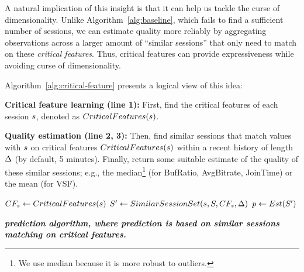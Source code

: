 A natural implication of this insight is that it can help us 
tackle  the curse of dimensionality.
Unlike Algorithm~\ref{alg:baseline}, which fails to find a 
sufficient number of sessions,
we can estimate quality more reliably by aggregating 
observations across a larger amount of ``similar sessions'' that 
only need to match on these {\em critical features}. 
Thus, critical features can provide expressiveness
while avoiding curse of dimensionality.

Algorithm~\ref{alg:critical-feature} presents a logical 
view of this idea:
\begin{packedenumerate}
\item {\bf Critical feature learning (line 1):} 
First, find the critical features of each session $s$, 
denoted as $CriticalFeatures(s)$.
\item {\bf Quality estimation (line 2, 3):}
Then, find similar sessions that match values with 
$s$ on critical features 
$CriticalFeatures(s)$ 
within a recent history of length $\Delta$ 
(by default, 5 minutes). 
Finally, return some suitable estimate of the quality of 
these similar sessions; 
e.g., the median\footnote{We use median because it 
is more robust to outliers.} 
(for BufRatio, AvgBitrate, JoinTime) or the mean (for VSF).
\end{packedenumerate}



\begin{algorithm}[t!]
\begin{small}
 $CF_{s}\leftarrow CriticalFeatures(s)$\;
 $S'\leftarrow SimilarSessionSet(s,S,CF_{s},\Delta)$\;
 $p\leftarrow Est(S')$\;
 \;
\end{small}
 \caption{{\bf {\em \dda prediction algorithm, where prediction is based on 
similar sessions matching on critical features.}}}
\label{alg:critical-feature}
\end{algorithm}



